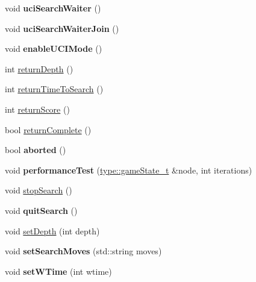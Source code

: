 \begin{DoxyCompactItemize}
void {\bfseries uci\+Search\+Waiter} ()
\item 
\mbox{\label{classdavid_1_1Search_aa07d8f9db7ebdbbaab08fb19ea7e4747}} 
void {\bfseries uci\+Search\+Waiter\+Join} ()
\item 
\mbox{\label{classdavid_1_1Search_a7d2a2b6d9ecd529696944468ffdda7b3}} 
void {\bfseries enable\+U\+C\+I\+Mode} ()
\item 
int \hyperlink{classdavid_1_1Search_aca35880f4373631acf04f5e394470c1f}{return\+Depth} ()
\item 
int \hyperlink{classdavid_1_1Search_aa61a42ed269f910f0fdc41c050c3e195}{return\+Time\+To\+Search} ()
\item 
int \hyperlink{classdavid_1_1Search_a4986ca7138add256e0c6e974e66c1c25}{return\+Score} ()
\item 
bool \hyperlink{classdavid_1_1Search_a7ce9c77d95a5883bea2f8ce2ed5f006b}{return\+Complete} ()
\item 
\mbox{\label{classdavid_1_1Search_a5b721b9fed74f278c8ff5f8314af642b}} 
bool {\bfseries aborted} ()
\item 
\mbox{\label{classdavid_1_1Search_a4892e06da8c95e6e5df00e5f0072ff74}} 
void {\bfseries performance\+Test} (\hyperlink{structdavid_1_1bitboard_1_1gameState}{type\+::game\+State\+\_\+t} \&node, int iterations)
\item 
void \hyperlink{classdavid_1_1Search_a2606078550d8ea05738960a9f171de08}{stop\+Search} ()
\item 
\mbox{\label{classdavid_1_1Search_a001d1c613473d161245bc4c70d9c7944}} 
void {\bfseries quit\+Search} ()
\item 
void \hyperlink{classdavid_1_1Search_a4c3398fb13ce8c3bc477ded05f75ec0e}{set\+Depth} (int depth)
\item 
\mbox{\label{classdavid_1_1Search_a816f2e2bfa507be243c8af5df82cc248}} 
void {\bfseries set\+Search\+Moves} (std\+::string moves)
\item 
\mbox{\label{classdavid_1_1Search_ac39d9e7faf111bcf7344b0499602e336}} 
void {\bfseries set\+W\+Time} (int wtime)
\item 

\end{DoxyCompactItemize}
